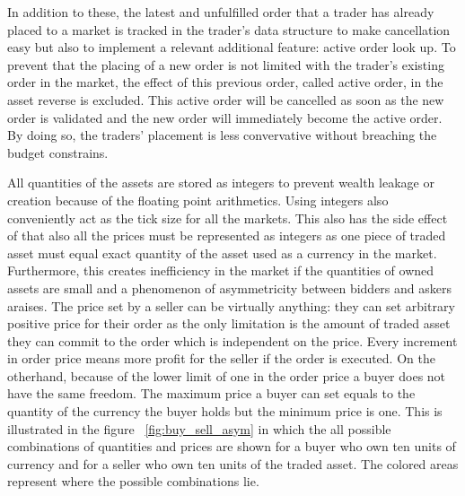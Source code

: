 In addition to these, the latest and unfulfilled order that a trader has already placed
to a market is tracked in the trader's data structure to make cancellation easy
but also to implement a relevant additional feature: active order look up. To prevent that
the placing of a new order is not limited with the trader's existing order in the market,
the effect of this previous order, called active order, in the asset reverse is excluded. 
This active order will be cancelled as soon as the new order is validated and the new order
will immediately become the active order. By doing so, the traders' placement is less 
convervative without breaching the budget constrains.


All quantities of the assets are stored as integers to prevent wealth leakage %
or creation because of the floating point arithmetics. Using integers also
conveniently act as the tick size for all the markets. This also has the side effect
of that also all the prices must be represented as integers as one piece
of traded asset must equal exact quantity of the asset used as a currency
in the market. Furthermore, this creates inefficiency in the market if the quantities
of owned assets are small and a phenomenon of asymmetricity between bidders and askers
araises. The price set by a seller can be virtually anything: they can set
arbitrary positive price for their order as the only limitation is the amount
of traded asset they can commit to the order which is independent on the price. 
Every increment in order price means more profit for the seller
if the order is executed. On the otherhand, because of the 
lower limit of one in the order price a buyer does not have the same freedom.
The maximum price a buyer can set equals to the quantity of the currency 
the buyer holds but the minimum price is one. This is
illustrated in the figure ~\ref{fig:buy_sell_asym} in which the all possible
combinations of quantities and prices are shown for a buyer who own ten units 
of currency and for a seller who own ten units of the traded asset. 
The colored areas represent where the possible combinations lie.


